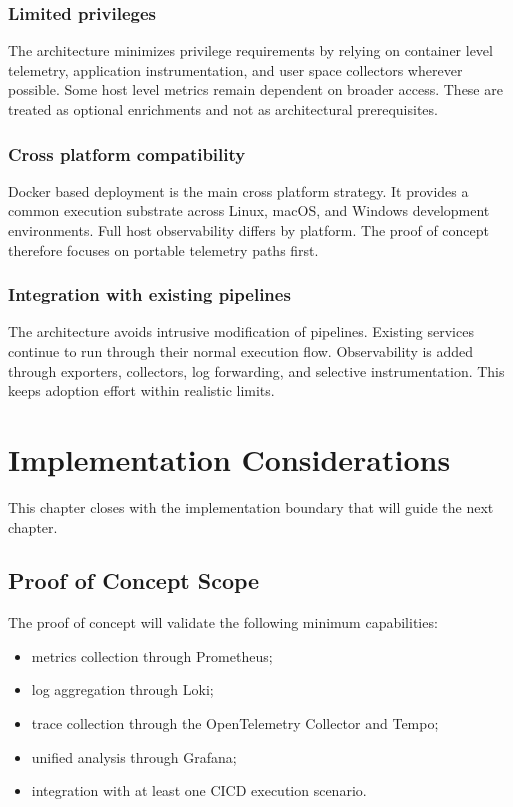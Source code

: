 \subsubsection{Limited privileges}
\label{subsubsec:privilege_solution}

The architecture minimizes privilege requirements by relying on container level telemetry, application instrumentation, and user space collectors wherever possible. Some host level metrics remain dependent on broader access. These are treated as optional enrichments and not as architectural prerequisites.

\subsubsection{Cross platform compatibility}
\label{subsubsec:crossplatform_solution}

Docker based deployment is the main cross platform strategy. It provides a common execution substrate across Linux, macOS, and Windows development environments. Full host observability differs by platform. The proof of concept therefore focuses on portable telemetry paths first.

\subsubsection{Integration with existing pipelines}
\label{subsubsec:integration_solution}

The architecture avoids intrusive modification of pipelines. Existing services continue to run through their normal execution flow. Observability is added through exporters, collectors, log forwarding, and selective instrumentation. This keeps adoption effort within realistic limits.

\section{Implementation Considerations}
\label{sec:implementation_considerations}

This chapter closes with the implementation boundary that will guide the next chapter.

\subsection{Proof of Concept Scope}
\label{subsec:poc}

The proof of concept will validate the following minimum capabilities:
\begin{itemize}
    \item metrics collection through Prometheus;
    \item log aggregation through Loki;
    \item trace collection through the OpenTelemetry Collector and Tempo;
    \item unified analysis through Grafana;
    \item integration with at least one \gls{CICD} execution scenario.
\end{itemize}


